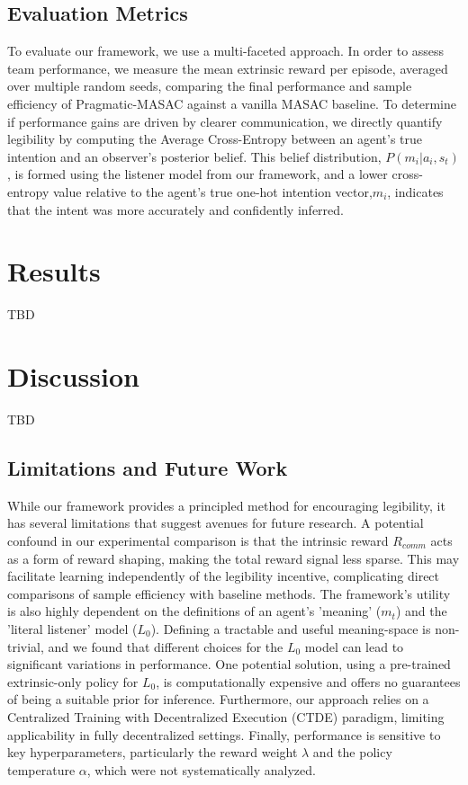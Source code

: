 \documentclass{article}
\begin{document}
\subsection{Evaluation Metrics}
\label{ssec:metrics}

To evaluate our framework, we use a multi-faceted approach. In order to assess team performance, we measure the mean extrinsic reward per episode, averaged over multiple random seeds, comparing the final performance and sample efficiency of Pragmatic-MASAC against a vanilla MASAC baseline. To determine if performance gains are driven by clearer communication, we directly quantify legibility by computing the Average Cross-Entropy between an agent's true intention and an observer's posterior belief. This belief distribution, $P(m_i | a_i, s_t)$, is formed using the listener model from our framework, and a lower cross-entropy value relative to the agent's true one-hot intention vector,$m_i$, indicates that the intent was more accurately and confidently inferred.

\section{Results}
\label{sec:results}

TBD

\section{Discussion}
\label{sec:discussion}

TBD

\subsection{Limitations and Future Work}

While our framework provides a principled method for encouraging legibility, it has several limitations that suggest avenues for future research. A potential confound in our experimental comparison is that the intrinsic reward $R_{comm}$ acts as a form of reward shaping, making the total reward signal less sparse. This may facilitate learning independently of the legibility incentive, complicating direct comparisons of sample efficiency with baseline methods. The framework's utility is also highly dependent on the definitions of an agent's 'meaning' ($m_t$) and the 'literal listener' model ($L_0$). Defining a tractable and useful meaning-space is non-trivial, and we found that different choices for the $L_0$ model can lead to significant variations in performance. One potential solution, using a pre-trained extrinsic-only policy for $L_0$, is computationally expensive and offers no guarantees of being a suitable prior for inference. Furthermore, our approach relies on a Centralized Training with Decentralized Execution (CTDE) paradigm, limiting applicability in fully decentralized settings. Finally, performance is sensitive to key hyperparameters, particularly the reward weight $\lambda$ and the policy temperature $\alpha$, which were not systematically analyzed.
\end{document}
